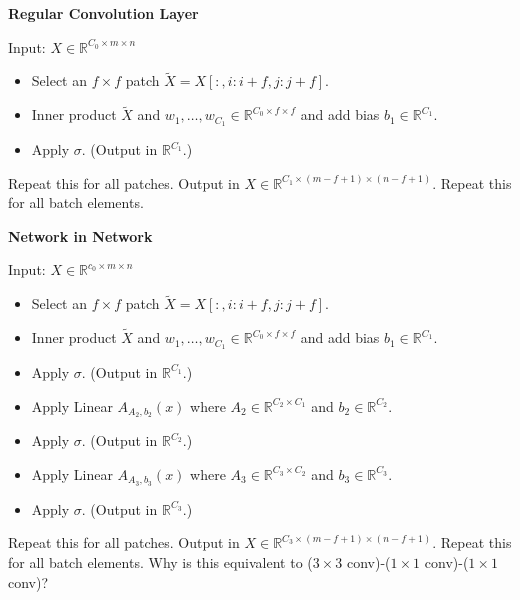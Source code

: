 \documentclass{report}
\begin{document}
\begin{concept}
    \textbf{Regular Convolution Layer}

    Input: $X \in \mathbb{R}^{C_{0} \times m \times n}$

    \begin{itemize}
        \item Select an $f \times f$ patch $\tilde{X}=X[:, i: i+f, j: j+f]$.
        \item Inner product $\tilde{X}$ and $w_{1}, \ldots, w_{C_{1}} \in \mathbb{R}^{C_{0} \times f \times f}$ and add bias $b_{1} \in \mathbb{R}^{C_{1}}$.
        \item Apply $\sigma$. (Output in $\mathbb{R}^{C_{1}}$.)
    \end{itemize}

    Repeat this for all patches. Output in $X \in \mathbb{R}^{C_{1} \times(m-f+1) \times(n-f+1)}$.
    Repeat this for all batch elements.

    \par\noindent\textcolor{gray}{\hdashrule{\textwidth}{0.4pt}{1pt 2pt}}

    \textbf{Network in Network}

    Input: $X \in \mathbb{R}^{c_{0} \times m \times n}$

    \begin{itemize}
        \item Select an $f \times f$ patch $\tilde{X}=X[:, i: i+f, j: j+f]$.
        \item Inner product $\tilde{X}$ and $w_{1}, \ldots, w_{C_{1}} \in \mathbb{R}^{C_{0} \times f \times f}$ and add bias $b_{1} \in \mathbb{R}^{C_{1}}$.
        \item Apply $\sigma$. (Output in $\mathbb{R}^{C_{1}}$.)
        \item Apply Linear $A_{A_{2}, b_{2}}(x)$ where $A_{2} \in \mathbb{R}^{C_{2} \times C_{1}}$ and $b_{2} \in \mathbb{R}^{C_{2}}$.
        \item Apply $\sigma$. (Output in $\mathbb{R}^{C_{2}}$.)
        \item Apply Linear $A_{A_{3}, b_{3}}(x)$ where $A_{3} \in \mathbb{R}^{C_{3} \times C_{2}}$ and $b_{3} \in \mathbb{R}^{C_{3}}$.
        \item Apply $\sigma$. (Output in $\mathbb{R}^{C_{3}}$.)
    \end{itemize}

    Repeat this for all patches. Output in $X \in \mathbb{R}^{C_{3} \times(m-f+1) \times(n-f+1)}$. Repeat this for all batch elements.
    Why is this equivalent to ($3 \times 3$ conv)-($1 \times 1$ conv)-($1 \times 1$ conv)?
\end{concept}
\end{document}
